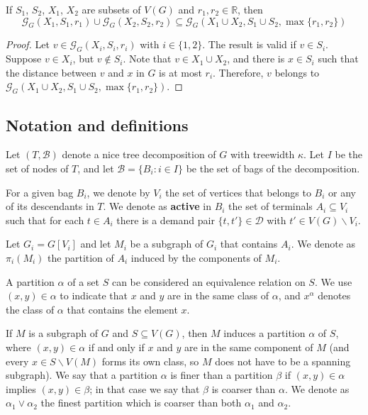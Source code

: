 \begin{corollary} \label{groupCor}
If \(S_1\), \(S_2\), \(X_1\), \(X_2\) are subsets of \(V(G)\) and \(r_1, r_2 \in \mathbb{R}\), then \[\mathcal{G}_G(X_1, S_1, r_1) \cup \mathcal{G}_G(X_2, S_2, r_2) \subseteq \mathcal{G}_G(X_1 \cup X_2, S_1 \cup S_2, \max\{r_1, r_2\})\]
\end{corollary}
\begin{proof}

Let \(v \in \mathcal{G}_G(X_i, S_i, r_i)\) with $i \in \{1,2\}$. The result is valid if \(v \in S_i\). Suppose \(v \in X_i\), but \(v \not\in S_i\). Note that \(v \in X_1 \cup X_2\), and there is \(x \in S_i\) such that the distance between \(v\) and \(x\) in \(G\) is at most \(r_i\). Therefore, \(v\) belongs to \(\mathcal{G}_G(X_1 \cup X_2, S_1 \cup S_2, \max\{r_1, r_2\})\).

\end{proof}

\subsection{Notation and definitions}

Let  \((T, \mathcal{B})\) denote a nice tree decomposition of \(G\) with treewidth \(\kappa\). Let \(I\) be the set of nodes of \(T\), and let \(\mathcal{B} = \{B_i \colon i \in I\}\) be the set of bags of the decomposition.

For a given bag \(B_i\), we denote by \(V_i\) the set of vertices that belongs to \(B_i\) or any of its descendants in \(T\). We denote as \textbf{active} in \(B_i\) the set of terminals \(A_i \subseteq V_i\) such that for each \(t \in A_i\) there is a demand pair \(\{t, t'\} \in \mathcal{D}\) with \(t' \in V(G)\backslash V_i\).

Let \(G_i = G[V_i]\) and let \(M_i\) be a subgraph of \(G_i\) that contains \(A_i\). We denote as \(\pi_i(M_i)\) the partition of \(A_i\) induced by the components of \(M_i\).

A partition \(\alpha\) of a set \(S\) can be considered an equivalence relation on \(S\). We use \((x, y) \in \alpha\) to indicate that \(x\) and \(y\) are in the same class of \(\alpha\), and \(x^\alpha\) denotes the class of \(\alpha\) that contains the element \(x\).

If \(M\) is a subgraph of \(G\) and \(S \subseteq V(G)\), then \(M\) induces a partition \(\alpha\) of \(S\), where \((x, y) \in \alpha\) if and only if \(x\) and \(y\) are in the same component of \(M\) (and every \(x \in S \backslash V(M)\) forms its own class, so \(M\) does not have to be a spanning subgraph). We say that a partition \(\alpha\) is finer than a partition \(\beta\) if \((x, y) \in \alpha\) implies \((x, y) \in \beta\); in that case we say that \(\beta\) is coarser than \(\alpha\). We denote as \(\alpha_1 \vee \alpha_2\) the finest partition which is coarser than both \(\alpha_1\) and \(\alpha_2\).

